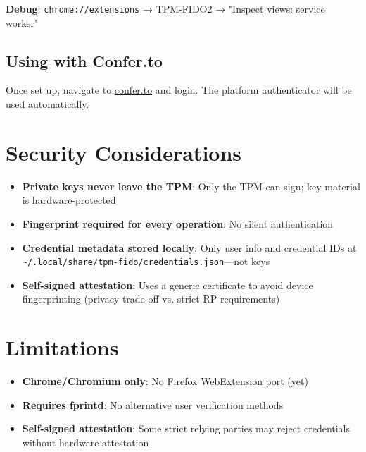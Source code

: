 \documentclass{article}
\begin{document}
\textbf{Debug}: \texttt{chrome://extensions} → TPM-FIDO2 → "Inspect views: service worker"

\subsection{Using with Confer.to}

Once set up, navigate to \href{https://confer.to}{confer.to} and login. The platform authenticator will be used automatically.

\section{Security Considerations}

\begin{itemize}
\item \textbf{Private keys never leave the TPM}: Only the TPM can sign; key material is hardware-protected

\item \textbf{Fingerprint required for every operation}: No silent authentication

\item \textbf{Credential metadata stored locally}: Only user info and credential IDs at \texttt{\textasciitilde{}/.local/share/tpm-fido/credentials.json}---not keys

\item \textbf{Self-signed attestation}: Uses a generic certificate to avoid device fingerprinting (privacy trade-off vs. strict RP requirements)

\end{itemize}

\section{Limitations}

\begin{itemize}
\item \textbf{Chrome/Chromium only}: No Firefox WebExtension port (yet)

\item \textbf{Requires fprintd}: No alternative user verification methods

\item \textbf{Self-signed attestation}: Some strict relying parties may reject credentials without hardware attestation

\end{itemize}
\end{document}
